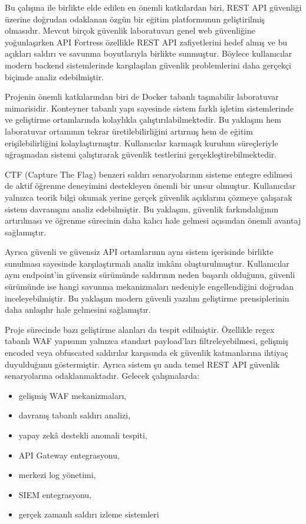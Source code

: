 Bu çalışma ile birlikte elde edilen en önemli katkılardan biri, REST API güvenliği üzerine doğrudan odaklanan özgün bir eğitim platformunun geliştirilmiş olmasıdır. Mevcut birçok güvenlik laboratuvarı genel web güvenliğine yoğunlaşırken API Fortress özellikle REST API zafiyetlerini hedef almış ve bu açıkları saldırı ve savunma boyutlarıyla birlikte sunmuştur. Böylece kullanıcılar modern backend sistemlerinde karşılaşılan güvenlik problemlerini daha gerçekçi biçimde analiz edebilmiştir.

Projenin önemli katkılarından biri de Docker tabanlı taşınabilir laboratuvar mimarisidir. Konteyner tabanlı yapı sayesinde sistem farklı işletim sistemlerinde ve geliştirme ortamlarında kolaylıkla çalıştırılabilmektedir. Bu yaklaşım hem laboratuvar ortamının tekrar üretilebilirliğini artırmış hem de eğitim erişilebilirliğini kolaylaştırmıştır. Kullanıcılar karmaşık kurulum süreçleriyle uğraşmadan sistemi çalıştırarak güvenlik testlerini gerçekleştirebilmektedir.

CTF (Capture The Flag) benzeri saldırı senaryolarının sisteme entegre edilmesi de aktif öğrenme deneyimini destekleyen önemli bir unsur olmuştur. Kullanıcılar yalnızca teorik bilgi okumak yerine gerçek güvenlik açıklarını çözmeye çalışarak sistem davranışını analiz edebilmiştir. Bu yaklaşım, güvenlik farkındalığının artırılması ve öğrenme sürecinin daha kalıcı hale gelmesi açısından önemli avantaj sağlamıştır.

Ayrıca güvenli ve güvensiz API ortamlarının aynı sistem içerisinde birlikte sunulması sayesinde karşılaştırmalı analiz imkânı oluşturulmuştur. Kullanıcılar aynı endpoint’in güvensiz sürümünde saldırının neden başarılı olduğunu, güvenli sürümünde ise hangi savunma mekanizmaları nedeniyle engellendiğini doğrudan inceleyebilmiştir. Bu yaklaşım modern güvenli yazılım geliştirme prensiplerinin daha anlaşılır hale gelmesini sağlamıştır.

Proje sürecinde bazı geliştirme alanları da tespit edilmiştir. Özellikle regex tabanlı WAF yapısının yalnızca standart payload’ları filtreleyebilmesi, gelişmiş encoded veya obfuscated saldırılar karşısında ek güvenlik katmanlarına ihtiyaç duyulduğunu göstermiştir. Ayrıca sistem şu anda temel REST API güvenlik senaryolarına odaklanmaktadır. Gelecek çalışmalarda:

\begin{itemize}[leftmargin=*]
    \item gelişmiş WAF mekanizmaları,
    \item davranış tabanlı saldırı analizi,
    \item yapay zekâ destekli anomali tespiti,
    \item API Gateway entegrasyonu,
    \item merkezi log yönetimi,
    \item SIEM entegrasyonu,
    \item gerçek zamanlı saldırı izleme sistemleri
\end{itemize}


